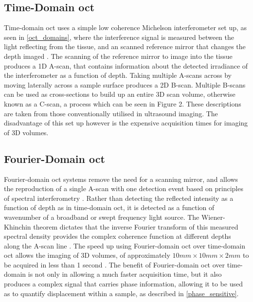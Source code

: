 \subsection{Time-Domain \ac{oct}}
Time-domain \ac{oct} uses a simple low coherence Michelson interferometer set up, as seen in \autoref{oct_domains}, where the interference signal is measured between the light reflecting from the tissue, and an scanned reference mirror that changes the depth imaged \cite{huang_optical_1991}. The scanning of the reference mirror to image into the tissue produces a 1D A-scan, that contains information about the detected irradiance of the interferometer as a function of depth. Taking multiple A-scans across by moving laterally across a sample surface produces a 2D B-scan. Multiple B-scans can be used as cross-sections to build up an entire 3D scan volume, otherwise known as a C-scan, a process which can be seen in Figure 2. These descriptions are taken from those conventionally utilised in ultrasound imaging. The disadvantage of this set up however is the expensive acquisition times for imaging of 3D volumes.

\subsection{Fourier-Domain \ac{oct}}
Fourier-domain \ac{oct} systems remove the need for a scanning mirror, and allows the reproduction of a single A-scan with one detection event based on principles of spectral interferometry \cite{chin_parametric_2016}. Rather than detecting the reflected intensity as a function of depth as in time-domain \ac{oct}, it is detected as a function of wavenumber of a broadband or swept frequency light source. The Wiener-Khinchin theorem dictates that the inverse Fourier transform of this measured spectral density provides the complex coherence function at different depths along the A-scan line \cite{schmitt_optical_1999}. The speed up using Fourier-domain \ac{oct} over time-domain \ac{oct} allows the imaging of 3D volumes, of approximately $10mm \times 10mm \times 2mm$ to be acquired in less than 1 second \cite{kennedy_emergence_2017}. The benefit of Fourier-domain \ac{oct} over time-domain is not only in allowing a much faster acquisition time, but it also produces a complex signal that carries phase information, allowing it to be used as to quantify displacement within a sample, as described in \autoref{phase_sensitive}.

